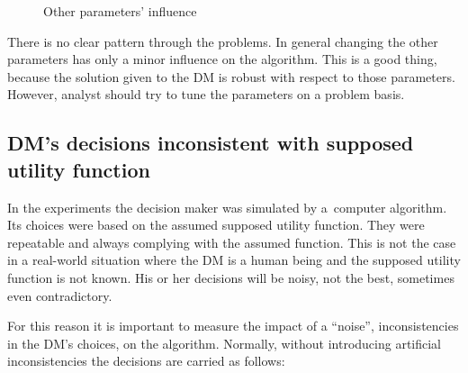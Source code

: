 \begin{figure}
{{    }
  }
  \caption{Other parameters' influence}
  \label{params2}
\end{figure}

There is no clear pattern through the problems. In general changing the other
parameters has only a minor influence on the algorithm. This is a good thing,
because the solution given to the DM is robust with respect to those
parameters. However, analyst should try to tune the parameters on a problem
basis.

\subsection{DM's decisions inconsistent with supposed utility function}
\label{dm-noise}


In the experiments the decision maker was simulated by a~computer
algorithm. Its choices were based on the assumed supposed utility
function. They were repeatable and always complying with the assumed
function. This is not the case in a real-world situation where the DM is a
human being and the supposed utility function is not known. His or her
decisions will be noisy, not the best, sometimes even contradictory.

For this reason it is important to measure the impact of a ``noise'',
inconsistencies in the DM's choices, on the algorithm. Normally, without
introducing artificial inconsistencies the decisions are carried as follows:

